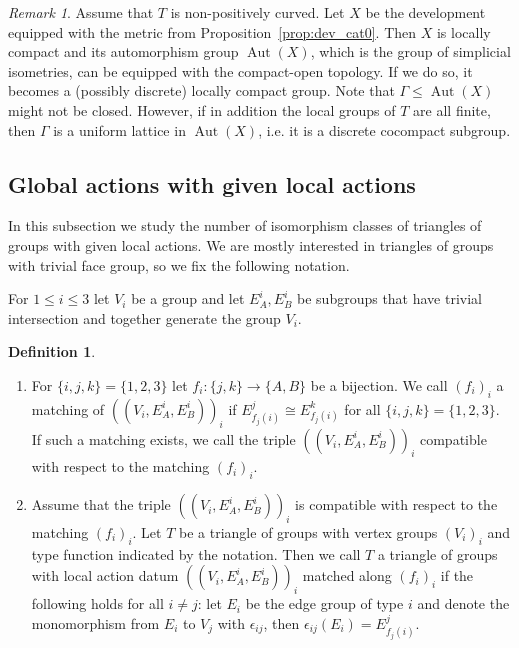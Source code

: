 \documentclass[dvipsnames]{article}
\theoremstyle{definition}
\newtheorem{definition}[theorem]{Definition}
\theoremstyle{remark}
\newtheorem{remark}[theorem]{Remark}
\DeclareMathOperator{\Aut}{Aut}
\begin{document}
    \begin{remark}
        Assume that $T$ is non-positively curved.
        Let $X$ be the development equipped with the metric from Proposition~\ref{prop:dev_cat0}. Then $X$ is locally compact and its automorphism group $\Aut(X)$, which is the group of simplicial isometries, can be equipped with the compact-open topology.
        If we do so, it becomes a (possibly discrete) locally compact group. Note that $\Gamma \leq \Aut(X)$ might not be closed. However, if in addition the local groups of $T$ are all finite, then $\Gamma$ is a uniform lattice in $\Aut(X)$, i.e. it is a discrete cocompact subgroup.
    \end{remark}
    
    \subsection{Global actions with given local actions}\label{subsec:given_local}
    
    In this subsection we study the number of isomorphism classes of triangles of groups with given local actions. We are mostly interested in triangles of groups with trivial face group, so we fix the following notation.

    For $1 \leq i \leq 3$ let $V_i$ be a group and let $E^i_A, E^i_B$ be subgroups that have trivial intersection and together generate the group $V_i$.
    \begin{definition}
    \begin{enumerate}
        \item
        For $\{i,j,k\} = \{1,2,3\}$ let $f_i : \{j, k\} \to \{A,B\}$ be a bijection. We call $(f_i)_i$ a matching of $((V_i,E^i_A, E^i_B))_i$ if $E^j_{f_j(i)} \cong E^k_{f_j(i)}$ for all $\{i,j,k\} = \{1,2,3\}$.
        If such a matching exists, we call the triple $((V_i,E^i_A, E^i_B))_i$ compatible with respect to the matching $(f_i)_i$.
        \item 
        Assume that the triple $((V_i,E^i_A, E^i_B))_i$ is compatible with respect to the matching $(f_i)_i$.
        Let $T$ be a triangle of groups with vertex groups $(V_i)_i$ and type function indicated by the notation.
        Then we call $T$ a triangle of groups with local action datum $((V_i,E^i_A, E^i_B))_i$ matched along $(f_i)_i$ if the following holds for all $i\neq j$: let $E_i$ be the edge group of type $i$ and denote the monomorphism from $E_i$ to $V_j$ with $\epsilon_{ij}$, then $\epsilon_{ij}(E_i) = E^j_{f_j(i)}$.
    \end{enumerate}
    \end{definition}
\end{document}
